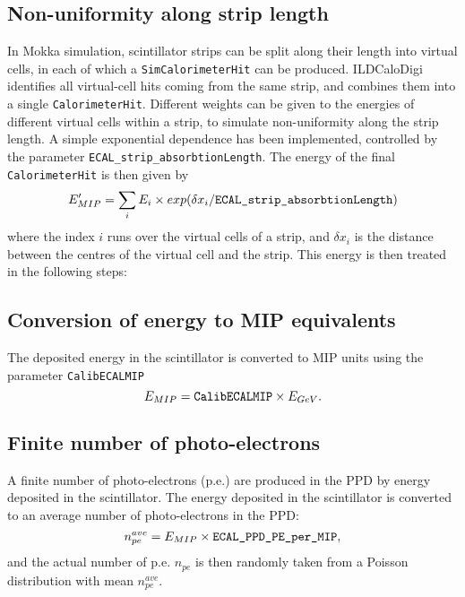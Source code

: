 \documentclass[12pt]{article} %
\begin{document}
\subsection*{Non-uniformity along strip length}
In Mokka simulation, scintillator strips can be split along their length into virtual cells, 
in each of which a {\tt SimCalorimeterHit} can be produced. 
ILDCaloDigi identifies all virtual-cell hits coming from the same strip, and combines them into a single {\tt CalorimeterHit}.
Different weights can be given to the energies of different virtual cells within a strip, to simulate non-uniformity
along the strip length. A simple exponential dependence has been implemented, controlled by the parameter
{\tt ECAL\_strip\_absorbtionLength}. The energy of the final {\tt CalorimeterHit} is then given by
\begin{equation*}
E'_{MIP} = \sum_{i} E_{i} \times exp( \delta x_i / \text{\tt ECAL\_strip\_absorbtionLength} )
\end{equation*}
where the index $i$ runs over the virtual cells of a strip, and $\delta x_i$ is the distance between the 
centres of the virtual cell and the strip. This energy is then treated in the following steps:

\subsection*{Conversion of energy to MIP equivalents}
The deposited energy in the scintillator is converted to MIP units using the parameter {\tt CalibECALMIP}
\begin{equation*}
E_{MIP} = \text{\tt CalibECALMIP} \times E_{GeV} .
\end{equation*}

\subsection*{Finite number of photo-electrons}
A finite number of photo-electrons (p.e.) are produced in the PPD by energy deposited in the scintillator.
The energy deposited in the scintillator is converted to an average number of photo-electrons in the PPD:
\begin{equation*}
n_{pe}^{ave} = E_{MIP} \times \text{\tt ECAL\_PPD\_PE\_per\_MIP},
\end{equation*}
and the actual number of p.e. $n_{pe}$ is then randomly taken from a Poisson distribution with mean $n_{pe}^{ave}$.
\end{document}
